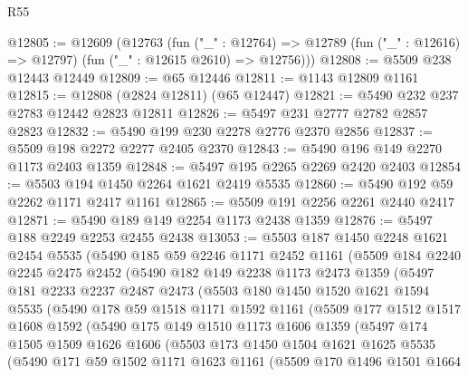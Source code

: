 \begin{lexlean}{R55}
\begin{coremodule}
@12805 := @12609
    (@12763
      (fun ("_" : @12764) =>
      @12789 (fun ("_" : @12616) => @12797) (fun ("_" : @12615 @2610) => @12756)))
@12808 := @5509 @238 @12443 @12449
@12809 := @65 @12446
@12811 := @1143 @12809 @1161
@12815 := @12808 (@2824 @12811) (@65 @12447)
@12821 := @5490 @232 @237 @2783 @12442 @2823 @12811
@12826 := @5497 @231 @2777 @2782 @2857 @2823
@12832 := @5490 @199 @230 @2278 @2776 @2370 @2856
@12837 := @5509 @198 @2272 @2277 @2405 @2370
@12843 := @5490 @196 @149 @2270 @1173 @2403 @1359
@12848 := @5497 @195 @2265 @2269 @2420 @2403
@12854 := @5503 @194 @1450 @2264 @1621 @2419 @5535
@12860 := @5490 @192 @59 @2262 @1171 @2417 @1161
@12865 := @5509 @191 @2256 @2261 @2440 @2417
@12871 := @5490 @189 @149 @2254 @1173 @2438 @1359
@12876 := @5497 @188 @2249 @2253 @2455 @2438
@13053 := @5503
    @187
    @1450
    @2248
    @1621
    @2454
    @5535
    (@5490
      @185
      @59
      @2246
      @1171
      @2452
      @1161
      (@5509
        @184
        @2240
        @2245
        @2475
        @2452
        (@5490
          @182
          @149
          @2238
          @1173
          @2473
          @1359
          (@5497
            @181
            @2233
            @2237
            @2487
            @2473
            (@5503
              @180
              @1450
              @1520
              @1621
              @1594
              @5535
              (@5490
                @178
                @59
                @1518
                @1171
                @1592
                @1161
                (@5509
                  @177
                  @1512
                  @1517
                  @1608
                  @1592
                  (@5490
                    @175
                    @149
                    @1510
                    @1173
                    @1606
                    @1359
                    (@5497
                      @174
                      @1505
                      @1509
                      @1626
                      @1606
                      (@5503
                        @173
                        @1450
                        @1504
                        @1621
                        @1625
                        @5535
                        (@5490
                          @171
                          @59
                          @1502
                          @1171
                          @1623
                          @1161
                          (@5509
                            @170
                            @1496
                            @1501
                            @1664

\end{coremodule}
\end{lexlean}

